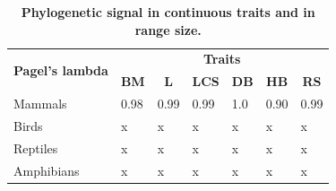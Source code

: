 \begin{table}[h!]
\renewcommand{\baselinestretch}{1}
\renewcommand{\arraystretch}{1.5}
\begin{center}\fontsize{9}{11}\selectfont
\caption[Phylogenetic signal in continuous traits]{\textbf{Phylogenetic signal in continuous traits and in range size.}} 
\label{physignalcont}
\begin{tabular}{|l|l|l|l|l|l|l|}
\hline
\multicolumn{1}{|c|}{\multirow{2}{*}{\textbf{Pagel's lambda}}} & \multicolumn{6}{c|}{\textbf{Traits}}                                                                                                                                                                            \\ \cline{2-7} 
\multicolumn{1}{|c|}{}                                         & \multicolumn{1}{c|}{\textbf{BM}} & \multicolumn{1}{c|}{\textbf{L}} & \multicolumn{1}{c|}{\textbf{LCS}} & \multicolumn{1}{c|}{\textbf{DB}} & \multicolumn{1}{c|}{\textbf{HB}} & \multicolumn{1}{c|}{\textbf{RS}} \\ \hline
Mammals                                                        & 0.98                             & 0.99                            & 0.99                              & 1.0                              & 0.90                             & 0.99                             \\ \hline
Birds                                                          & x                                & x                               & x                                 & x                                & x                                & x                                \\ \hline
Reptiles                                                       & x                                & x                               & x                                 & x                                & x                                & x                                \\ \hline
Amphibians                                                     & x                                & x                               & x                                 & x                                & x                                & x                                \\ \hline
\end{tabular}
\end{center}
\end{table}

